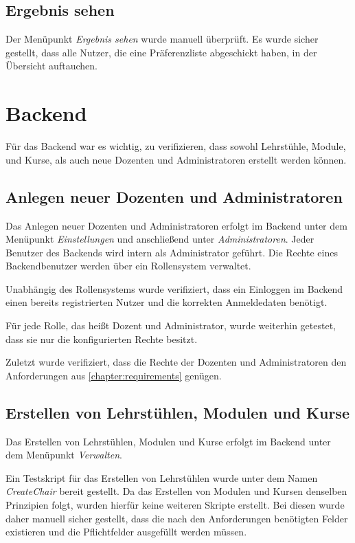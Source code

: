 		\subsection{Ergebnis sehen}
			Der Menüpunkt \textit{Ergebnis sehen} wurde manuell überprüft.
			Es wurde sicher gestellt, dass alle Nutzer, die eine Präferenzliste abgeschickt haben, in der Übersicht auftauchen.
		
	\section{Backend}
	
		Für das Backend war es wichtig, zu verifizieren, dass sowohl Lehrstühle, Module, und Kurse, als auch neue Dozenten und Administratoren erstellt werden können.
			
		\subsection{Anlegen neuer Dozenten und Administratoren}
		
			Das Anlegen neuer Dozenten und Administratoren erfolgt im Backend unter dem Menüpunkt \textit{Einstellungen} und anschließend unter \textit{Administratoren}.
			Jeder Benutzer des Backends wird intern als Administrator geführt.
			Die Rechte eines Backendbenutzer werden über ein Rollensystem verwaltet.
            
			Unabhängig des Rollensystems wurde verifiziert, dass ein Einloggen im Backend einen bereits registrierten Nutzer und die korrekten Anmeldedaten benötigt.
            
			Für jede Rolle, das heißt Dozent und Administrator, wurde weiterhin getestet, dass sie nur die konfigurierten Rechte besitzt.
            
			Zuletzt wurde verifiziert, dass die Rechte der Dozenten und Administratoren den Anforderungen aus \ref{chapter:requirements} genügen.
			
		\subsection{Erstellen von Lehrstühlen, Modulen und Kurse}
			
			Das Erstellen von Lehrstühlen, Modulen und Kurse erfolgt im Backend unter dem Menüpunkt \textit{Verwalten}.
            
			Ein Testskript für das Erstellen von Lehrstühlen wurde unter dem Namen \textit{CreateChair} bereit gestellt.
			Da das Erstellen von Modulen und Kursen denselben Prinzipien folgt, wurden hierfür keine weiteren Skripte erstellt.
			Bei diesen wurde daher manuell sicher gestellt, dass die nach den Anforderungen benötigten Felder existieren und die Pflichtfelder ausgefüllt werden müssen.
            
